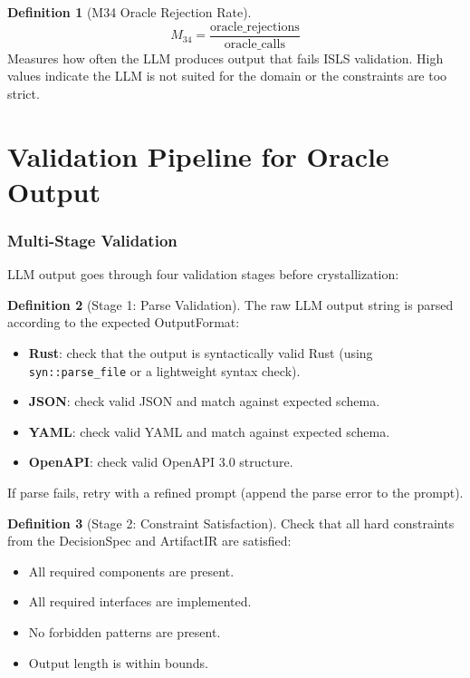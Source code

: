 \documentclass[11pt,a4paper,twoside]{article}
\theoremstyle{definition}
\newtheorem{definition}{Definition}[section]
\theoremstyle{plain}
\theoremstyle{remark}
\newcommand{\ISLS}{\textsf{ISLS}}
\begin{document}
\begin{definition}[M34 Oracle Rejection Rate]\label{def:m34}
\[
  M_{34} = \frac{\mathrm{oracle\_rejections}}{\mathrm{oracle\_calls}}
\]
Measures how often the LLM produces output that fails \ISLS{}
validation. High values indicate the LLM is not suited for the
domain or the constraints are too strict.
\end{definition}


\part{Validation Pipeline for Oracle Output}\label{part:validation}

\section{Multi-Stage Validation}\label{sec:multival}

LLM output goes through four validation stages before crystallization:

\begin{definition}[Stage 1: Parse Validation]\label{def:parse}
The raw LLM output string is parsed according to the expected
OutputFormat:
\begin{itemize}[nosep]
  \item \textbf{Rust}: check that the output is syntactically valid
        Rust (using \texttt{syn::parse\_file} or a lightweight
        syntax check).
  \item \textbf{JSON}: check valid JSON and match against expected
        schema.
  \item \textbf{YAML}: check valid YAML and match against expected
        schema.
  \item \textbf{OpenAPI}: check valid OpenAPI 3.0 structure.
\end{itemize}
If parse fails, retry with a refined prompt (append the parse error
to the prompt).
\end{definition}

\begin{definition}[Stage 2: Constraint Satisfaction]\label{def:constsat}
Check that all hard constraints from the DecisionSpec and ArtifactIR
are satisfied:
\begin{itemize}[nosep]
  \item All required components are present.
  \item All required interfaces are implemented.
  \item No forbidden patterns are present.
  \item Output length is within bounds.
\end{itemize}
\end{definition}
\end{document}
